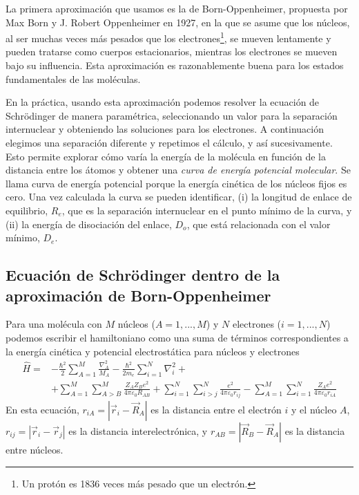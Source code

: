 \documentclass{tufte-handout}
\begin{document}
La primera aproximación que usamos es la de Born-Oppenheimer,
propuesta por Max Born y J. Robert Oppenheimer en 1927, en
la que se asume que los núcleos, al ser muchas
veces más pesados que los electrones\footnote{Un protón es 1836 veces más pesado que un electrón.}, se mueven lentamente
y pueden tratarse como cuerpos estacionarios, mientras los 
electrones se mueven bajo su influencia. Esta aproximación es 
razonablemente buena para los estados fundamentales de las 
moléculas. 

En la práctica, usando esta aproximación podemos 
resolver la ecuación de Schrödinger de manera 
paramétrica, seleccionando
un valor para la separación internuclear y obteniendo
las soluciones para los electrones. A continuación elegimos 
una separación diferente y repetimos el cálculo, y así
sucesivamente. Esto permite explorar cómo varía la energía 
de la molécula en función de la distancia entre los átomos
y obtener una \textit{curva de energía potencial molecular}.
Se llama curva de energía potencial porque la energía cinética
de los núcleos fijos es cero. Una vez calculada la curva se
pueden identificar, (i) la longitud de enlace de equilibrio,
$R_e$, que es la separación internuclear en el punto mínimo de
la curva, y (ii) la energía de disociación del enlace, $D_o$,
que está relacionada con el valor mínimo, $D_e$.

\subsection{Ecuación de Schrödinger dentro de la 
aproximación de Born-Oppenheimer}
Para una molécula con $M$ núcleos ($A=1,...,M$) y 
$N$ electrones ($i=1,...,N$) podemos escribir el hamiltoniano
como una suma de términos correspondientes a la energía cinética
y potencial electrostática para núcleos y electrones
\begin{equation}
 \begin{split}  
\hat{H}=& -\frac{\hbar^2}{2}\sum_{A=1}^M\frac{\nabla^2_A}{M_A}
    -\frac{\hbar^2}{2m_e}\sum_{i=1}^N\nabla^2_i
    +\\
&+\sum_{A=1}^M\sum_{A>B}^M\frac{Z_AZ_Be^2}{4\pi\varepsilon_0R_{AB}}
+\sum_{i=1}^N\sum_{i>j}^N \frac{e^2}{4\pi\varepsilon_0r_{ij}}
-\sum_{A=1}^M\sum_{i=1}^{N}\frac{Z_Ae^2}{4\pi\varepsilon_0r_{iA}}
\end{split}
\end{equation}
En esta ecuación, $r_{iA}=|\vec{r}_i-\vec{R}_A|$ es la distancia
entre el electrón $i$ y el núcleo $A$, $r_{ij}=|\vec{r}_i-\vec{r}_j|$ 
es la distancia interelectrónica, y $r_{AB}=|\vec{R}_B-\vec{R}_A|$
es la distancia entre núcleos.
\end{document}
